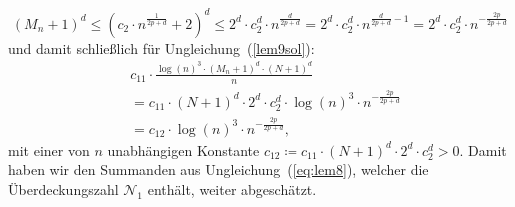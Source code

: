 {$$
(M_n + 1)^d \leq (c_2 \cdot n^{\frac{1}{2p + d}} + 2)^d \leq 2^d \cdot c_2^d \cdot n^{\frac{d}{2p + d}} = 2^d \cdot c_2^d \cdot n^{\frac{d}{2p + d} - 1} = 2^d \cdot c_2^d \cdot n^{-\frac{2p}{2p + d}}
$$
und damit schließlich für Ungleichung~(\ref{lem9sol}):
\begin{equation}
\begin{split}
& c_{11} \cdot \frac{\log(n)^3 \cdot (M_n + 1)^d \cdot (N + 1)^d}{n} \\
& = c_{11} \cdot (N+1)^d \cdot 2^d \cdot c_2^d \cdot \log(n)^3 \cdot n^{-\frac{2p}{2p + d}} \\
& = c_{12} \cdot \log(n)^3 \cdot n^{-\frac{2p}{2p + d}},
\end{split}
\end{equation}
mit einer von $n$ unabhängigen Konstante $c_{12} \coloneqq c_{11} \cdot (N + 1)^d \cdot 2^d \cdot c_2^d > 0.$
Damit haben wir den Summanden aus Ungleichung~(\ref{eq:lem8}), welcher die Überdeckungszahl $\mathcal{N}_1$ enthält, weiter abgeschätzt.

}
